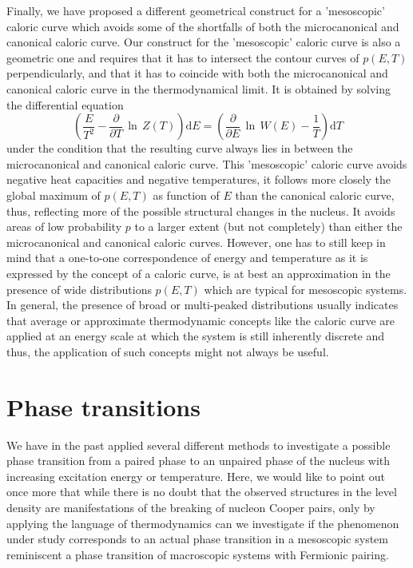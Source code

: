 \documentclass[sort&compress,final,numberedheadings]{aipproc}
\begin{document}
Finally, we have proposed \cite{SG03} a different geometrical construct for a 
'mesoscopic' caloric curve which avoids some of the shortfalls of both the 
microcanonical and canonical caloric curve. Our construct for the 'mesoscopic'
caloric curve is also a geometric one and requires that it has to intersect the
contour curves of $p(E,T)$ perpendicularly, and that it has to coincide with 
both the microcanonical and canonical caloric curve in the thermodynamical 
limit. It is obtained by solving the differential equation
\begin{equation}
\left(\frac{E}{T^2}-\frac{\partial}{\partial T}\,\ln\,Z(T)\right){\mathrm{d}}E=
\left(\frac{\partial}{\partial E}\,\ln\,W(E)-\frac{1}{T}\right){\mathrm{d}}T
\end{equation}
under the condition that the resulting curve always lies in between the 
microcanonical and canonical caloric curve. This 'mesoscopic' caloric curve 
avoids negative heat capacities and negative temperatures, it follows more 
closely the global maximum of $p(E,T)$ as function of $E$ than the canonical 
caloric curve, thus, reflecting more of the possible structural changes in the 
nucleus. It avoids areas of low probability $p$ to a larger extent (but not
completely) than either the microcanonical and canonical caloric curves. 
However, one has to still keep in mind that a one-to-one correspondence of 
energy and temperature as it is expressed by the concept of a caloric curve, is
at best an approximation in the presence of wide distributions $p(E,T)$ which 
are typical for mesoscopic systems. In general, the presence of broad or 
multi-peaked distributions usually indicates that average or approximate 
thermodynamic concepts like the caloric curve are applied at an energy scale at
which the system is still inherently discrete and thus, the application of such
concepts might not always be useful.

\section{Phase transitions}
\label{sect:phasetrans}

We have in the past applied several different methods to investigate a possible
phase transition from a paired phase to an unpaired phase of the nucleus with
increasing excitation energy or temperature. Here, we would like to point out 
once more that while there is no doubt that the observed structures in the 
level density are manifestations of the breaking of nucleon Cooper pairs, only 
by applying the language of thermodynamics can we investigate if the phenomenon
under study corresponds to an actual phase transition in a mesoscopic system 
reminiscent a phase transition of macroscopic systems with Fermionic pairing.
\end{document}
